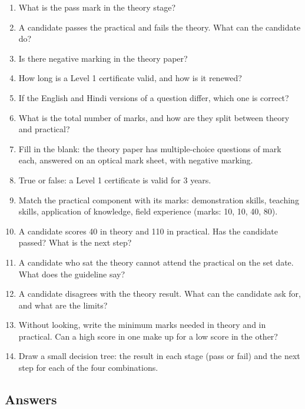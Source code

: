 \begin{enumerate}
\item What is the pass mark in the theory stage?
\item A candidate passes the practical and fails the theory. What can the candidate do?
\item Is there negative marking in the theory paper?
\item How long is a Level 1 certificate valid, and how is it renewed?
\item If the English and Hindi versions of a question differ, which one is correct?
\item What is the total number of marks, and how are they split between theory and practical?
\item Fill in the blank: the theory paper has multiple-choice questions of \underline{\hspace{1cm}} mark each, answered on an optical mark sheet, with \underline{\hspace{1cm}} negative marking.
\item True or false: a Level 1 certificate is valid for 3 years.
\item Match the practical component with its marks: demonstration skills, teaching skills, application of knowledge, field experience (marks: 10, 10, 40, 80).
\item A candidate scores 40 in theory and 110 in practical. Has the candidate passed? What is the next step?
\item A candidate who sat the theory cannot attend the practical on the set date. What does the guideline say?
\item A candidate disagrees with the theory result. What can the candidate ask for, and what are the limits?
\item Without looking, write the minimum marks needed in theory and in practical. Can a high score in one make up for a low score in the other?
\item Draw a small decision tree: the result in each stage (pass or fail) and the next step for each of the four combinations.
\end{enumerate}

\subsection*{Answers}

